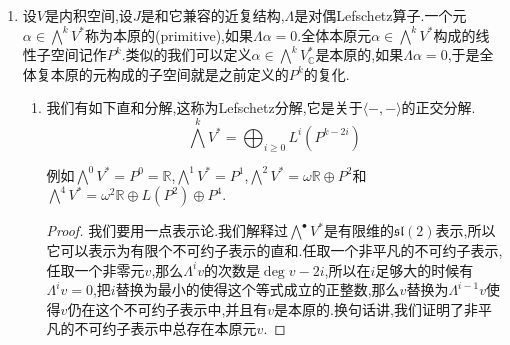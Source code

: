 \begin{enumerate}
\begin{enumerate}[(1)]
\begin{proof}
        	我们知道$\mathfrak{sl}(2)$是$\mathbb{R}$或者$\mathbb{C}$上由迹零的2阶矩阵构成的李代数,它的一组基为$X=\left(\begin{array}{cc}0&1\\0&0\end{array}\right)$,$Y=\left(\begin{array}{cc}0&0\\1&0\end{array}\right)$和$Z=\left(\begin{array}{cc}1&0\\0&-1\end{array}\right)$,它们满足$[Z,X]=2X$,$[Z,Y]=-2Y$和$[X,Y]=Z$.所以映射$X\mapsto L$,$Y\mapsto\Lambda$,$Z\mapsto H$提供了一个李代数同态$\mathfrak{sl}(2)\to\mathrm{End}(\bigwedge^{\bullet}V^*)$.张量$\mathbb{C}$得到复空间上的结论.
        \end{proof}
        \item 推论.对任意$\alpha\in\bigwedge^kV^*$有$[L^i,\Lambda](\alpha)=i(k-n+i-1)L^{i-1}(\alpha)$.这件事对$i$归纳就行.
    \end{enumerate}
    \item 设$V$是内积空间,设$J$是和它兼容的近复结构,$\Lambda$是对偶Lefschetz算子.一个元$\alpha\in\bigwedge^kV^*$称为本原的(primitive),如果$\Lambda\alpha=0$.全体本原元$\alpha\in\bigwedge^kV^*$构成的线性子空间记作$P^k$.类似的我们可以定义$\alpha\in\bigwedge^kV^*_{\mathbb{C}}$是本原的,如果$\Lambda\alpha=0$,于是全体复本原的元构成的子空间就是之前定义的$P^k$的复化.
    \begin{enumerate}[(1)]
    	\item 我们有如下直和分解,这称为Lefschetz分解,它是关于$\langle-,-\rangle$的正交分解.
    	$$\bigwedge^kV^*=\bigoplus_{i\ge0}L^i(P^{k-2i})$$
    	
    	例如$\bigwedge^0V^*=P^0=\mathbb{R}$,$\bigwedge^1V^*=P^1$,$\bigwedge^2V^*=\omega\mathbb{R}\oplus P^2$和$\bigwedge^4V^*=\omega^2\mathbb{R}\oplus L(P^2)\oplus P^4$.
    	\begin{proof}
    		
    		我们要用一点表示论.我们解释过$\bigwedge^{\bullet}V^*$是有限维的$\mathfrak{sl}(2)$表示,所以它可以表示为有限个不可约子表示的直和.任取一个非平凡的不可约子表示,任取一个非零元$v$,那么$\Lambda^iv$的次数是$\deg v-2i$,所以在$i$足够大的时候有$\Lambda^iv=0$,把$i$替换为最小的使得这个等式成立的正整数,那么$v$替换为$\Lambda^{i-1}v$使得$v$仍在这个不可约子表示中,并且有$v$是本原的.换句话讲,我们证明了非平凡的不可约子表示中总存在本原元$v$.
    		
    		\qquad
    		

\end{proof}
\end{enumerate}
\end{enumerate}
